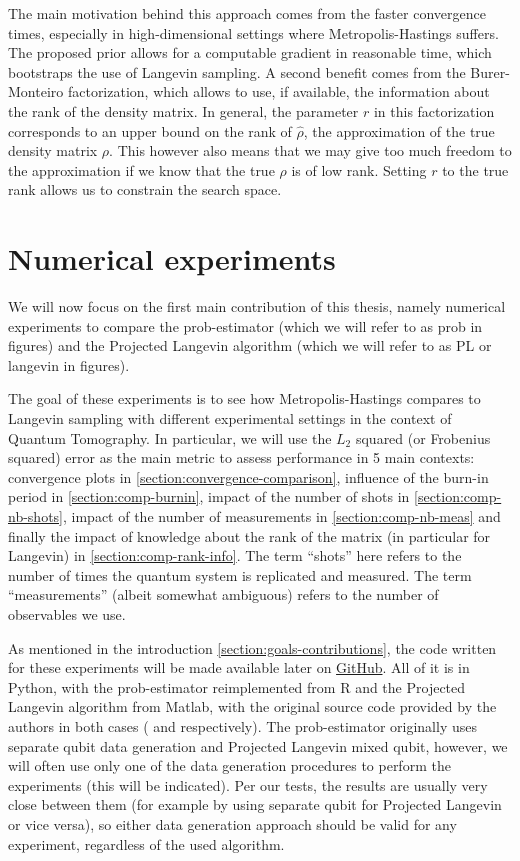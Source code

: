 \documentclass[12pt]{memoir}
\begin{document}
The main motivation behind this approach comes from the faster convergence times, especially in high-dimensional settings where Metropolis-Hastings suffers. The proposed prior allows for a computable gradient in reasonable time, which bootstraps the use of Langevin sampling. A second benefit comes from the Burer-Monteiro factorization, which allows to use, if available, the information about the rank of the density matrix. In general, the parameter $r$ in this factorization corresponds to an upper bound on the rank of $\hat \rho$, the approximation of the true density matrix $\rho$. This however also means that we may give too much freedom to the approximation if we know that the true $\rho$ is of low rank. Setting $r$ to the true rank allows us to constrain the search space.\medbreak




\chapter{Numerical experiments}\label{section:numerical-exp}

We will now focus on the first main contribution of this thesis, namely numerical experiments to compare the prob-estimator (which we will refer to as prob in figures) and the Projected Langevin algorithm (which we will refer to as PL or langevin in figures).\medbreak


The goal of these experiments is to see how  Metropolis-Hastings compares to Langevin sampling with different experimental settings in the context of Quantum Tomography. In particular, we will use the $L_2$ squared (or Frobenius squared) error as the main metric to assess performance in 5 main contexts: convergence plots in \ref{section:convergence-comparison}, influence of the burn-in period in \ref{section:comp-burnin}, impact of the number of shots in \ref{section:comp-nb-shots}, impact of the number of measurements in \ref{section:comp-nb-meas} and finally the impact of knowledge about the rank of the matrix (in particular for Langevin) in \ref{section:comp-rank-info}. The term ``shots'' here refers to the number of times the quantum system is replicated and measured. The term ``measurements'' (albeit somewhat ambiguous) refers to the number of observables we use. \medbreak


As mentioned in the introduction \ref{section:goals-contributions}, the code written for these experiments will be made available later on \href{https://github.com/daqwes/thesis}{GitHub}. All of it is in Python, with the prob-estimator reimplemented from R and the Projected Langevin algorithm from Matlab, with the original source code provided by the authors in both cases (\cite{MA17} and \cite{meth:bayesian:Langevin:ACMT2024} respectively). The prob-estimator originally uses separate qubit data generation and Projected Langevin mixed qubit, however, we will often use only one of the data generation procedures to perform the experiments (this will be indicated). Per our tests, the results are usually very close between them (for example by using separate qubit for Projected Langevin or vice versa), so either data generation approach should be valid for any experiment, regardless of the used algorithm.\medbreak
\end{document}

